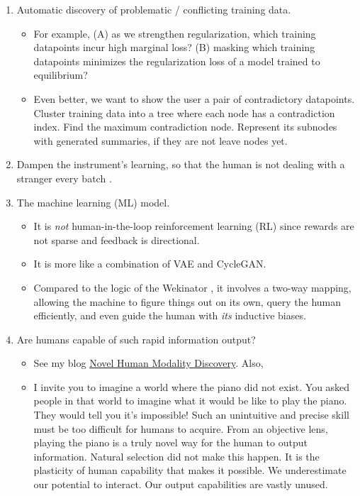 \documentclass{article}
\begin{document}
\begin{enumerate}
\begin{itemize}
\end{itemize}
\item Automatic discovery of problematic / conflicting training data. 
\begin{itemize}
\item For example, (A) as we strengthen regularization, which training datapoints incur high marginal loss? (B) masking which training datapoints minimizes the regularization loss of a model trained to equilibrium? 
\item Even better, we want to show the user a pair of contradictory datapoints. Cluster training data into a tree where each node has a contradiction index. Find the maximum contradiction node. Represent its subnodes with generated summaries, if they are not leave nodes yet. 
\end{itemize}
\item Dampen the instrument’s learning, so that the human is not dealing with a stranger every batch \cite{comm_with_cartwright}. 
\item The machine learning (ML) model. 
\begin{itemize}
\item It is \textit{not} human-in-the-loop reinforcement learning (RL) since rewards are not sparse and feedback is directional. 
\item It is more like a combination of VAE and CycleGAN. 
\item Compared to the logic of the Wekinator \cite{fiebrink_phd_thesis}, it involves a two-way mapping, allowing the machine to figure things out on its own, query the human efficiently, and even guide the human with \textit{its} inductive biases. 
\end{itemize}
\item Are humans capable of such rapid information output? 
\begin{itemize}
\item See my blog \href{/#/blog/new_modalities}{Novel Human Modality Discovery}. Also, 
\item I invite you to imagine a world where the piano did not exist. You asked people in that world to imagine what it would be like to play the piano. They would tell you it's impossible! Such an unintuitive and precise skill must be too difficult for humans to acquire. From an objective lens, playing the piano is a truly novel way for the human to output information. Natural selection did not make this happen. It is the plasticity of human capability that makes it possible. We underestimate our potential to interact. Our output capabilities are vastly unused. 

\end{itemize}
\end{enumerate}
\end{document}
